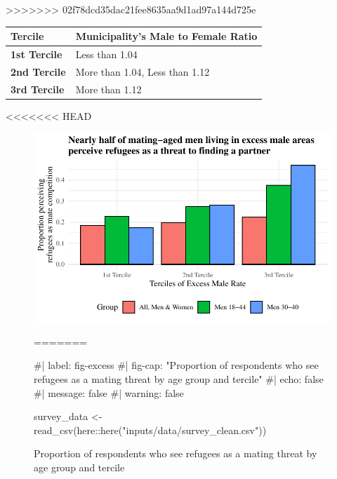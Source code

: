 \documentclass[
]{article}
\newenvironment{Shaded}{\begin{snugshade}}{\end{snugshade}}
\newcommand{\CommentTok}[1]{\textcolor[rgb]{0.37,0.37,0.37}{#1}}
\newcommand{\FunctionTok}[1]{\textcolor[rgb]{0.28,0.35,0.67}{#1}}
\newcommand{\NormalTok}[1]{\textcolor[rgb]{0.00,0.23,0.31}{#1}}
\newcommand{\OtherTok}[1]{\textcolor[rgb]{0.00,0.23,0.31}{#1}}
\newcommand{\SpecialCharTok}[1]{\textcolor[rgb]{0.37,0.37,0.37}{#1}}
\newcommand{\StringTok}[1]{\textcolor[rgb]{0.13,0.47,0.30}{#1}}
\begin{document}
\begin{table}
>>>>>>> 02f78dcd35dac21fee8635aa9d1ad97a144d725e
\begin{tabular}{>{\raggedright\arraybackslash}p{10em}>{\raggedright\arraybackslash}p{20em}}
\toprule
Tercile & Municipality's Male to Female Ratio\\
\midrule
\textbf{1st Tercile} & Less than 1.04\\
\textbf{2nd Tercile} & More than 1.04, Less than 1.12\\
\textbf{3rd Tercile} & More than 1.12\\
\bottomrule
\end{tabular}
<<<<<<< HEAD
\end{table}

\begin{figure}

{\centering \includegraphics{paper_files/figure-pdf/fig-excess-1.pdf}

}

\caption{\label{fig-excess}Proportion of respondents who see refugees as
a mating threat by age group and tercile}

=======

\begin{Shaded}
\begin{Highlighting}[]
\CommentTok{\#| label: fig{-}excess}
\CommentTok{\#| fig{-}cap: "Proportion of respondents who see refugees as a mating threat by age group and tercile"}
\CommentTok{\#| echo: false}
\CommentTok{\#| message: false}
\CommentTok{\#| warning: false}

\NormalTok{survey\_data }\OtherTok{\textless{}{-}} \FunctionTok{read\_csv}\NormalTok{(here}\SpecialCharTok{::}\FunctionTok{here}\NormalTok{(}\StringTok{"inputs/data/survey\_clean.csv"}\NormalTok{))}
\end{Highlighting}
\end{Shaded}


\end{figure}
\end{document}
